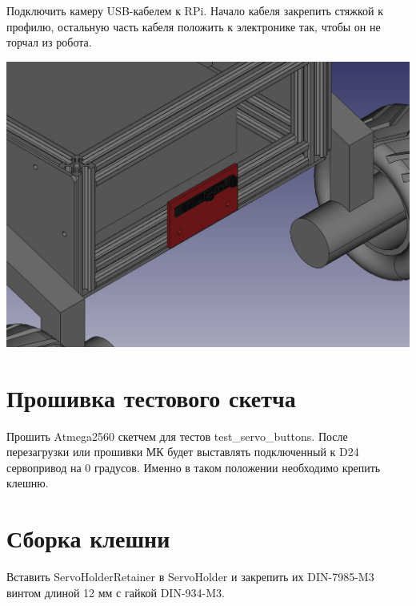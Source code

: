 \documentclass[12pt,a4paper,oneside]{article}
\begin{document}
Подключить камеру USB-кабелем к RPi. Начало кабеля закрепить стяжкой к профилю,
остальную часть кабеля положить к электронике так, чтобы он не торчал из робота.

\includegraphics[width=\textwidth]{cameraholder}


\section{Прошивка тестового скетча}
Прошить Atmega2560 скетчем для тестов test\_servo\_buttons. После перезагрузки или
прошивки МК будет выставлять подключенный к D24 сервопривод на 0 градусов.
Именно в таком положении необходимо крепить клешню.

\section{Сборка клешни}

Вставить ServoHolderRetainer в ServoHolder и закрепить их DIN-7985-M3 винтом
длиной 12 мм с гайкой DIN-934-M3.
\end{document}
